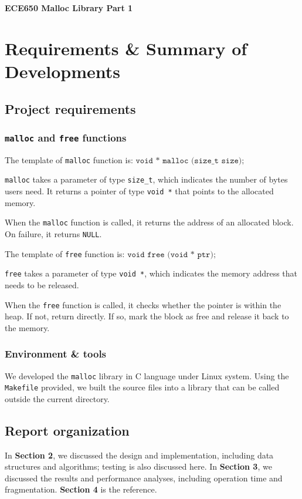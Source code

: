 \documentclass[a4paper,12pt]{article}
\begin{document}
	\begin{center}
		{
		\Large
		\textbf{ECE650 Malloc Library Part 1}\\
		\normalsize
		}
	\end{center}
	
	\section{Requirements \& Summary of Developments}
	\subsection{Project requirements}
	\subsubsection{\texttt{malloc} and \texttt{free} functions}
	\par The template of \texttt{malloc} function is: $\texttt{void * malloc (size\_t size);}$
	\par \texttt{malloc} takes a parameter of type \texttt{size\_t}, which indicates the number of bytes users need. It returns a pointer of type \texttt{void *} that points to the allocated memory. 
	\par When the \texttt{malloc} function is called, it returns the address of an allocated block. On failure, it returns \texttt{NULL}. 
	\par The template of \texttt{free} function is: $\texttt{void free (void * ptr);}$
	\par \texttt{free} takes a parameter of type \texttt{void *}, which indicates the memory address that needs to be released. 
	\par When the \texttt{free} function is called, it checks whether the pointer is within the heap. If not, return directly. If so, mark the block as free and release it back to the memory. 
	\subsubsection{Environment \& tools}
	\par We developed the \texttt{malloc} library in C language under Linux system. Using the \texttt{Makefile} provided, we built the source files into a library that can be called outside the current directory. 
	\subsection{Report organization}
	\par In \textbf{Section 2}, we discussed the design and implementation, including data structures and algorithms; testing is also discussed here. In \textbf{Section 3}, we discussed the results and performance analyses, including operation time and fragmentation. \textbf{Section 4} is the reference. 
\end{document}
